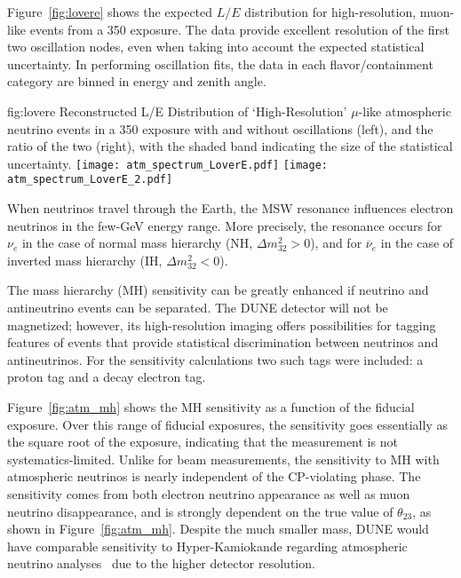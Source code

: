 Figure~\ref{fig:lovere} shows the expected $L/E$ distribution for high-resolution, muon-like 
events from a \SI{350}{\ktyr} exposure. The data provide excellent resolution of the 
first two oscillation nodes, even when taking into account the expected statistical uncertainty.
In performing oscillation fits, the data in each flavor/containment category are 
binned in energy and zenith angle.

\begin{dunefigure}
{fig:lovere}
{Reconstructed L/E Distribution of `High-Resolution'
$\mu$-like atmospheric neutrino events in a \SI{350}{\ktyr} exposure with and
without oscillations (left), and the ratio of the two (right), with the
shaded band indicating the size of the statistical uncertainty.}
\texttt{[image: atm\_spectrum\_LoverE.pdf]}
\texttt{[image: atm\_spectrum\_LoverE\_2.pdf]}
\end{dunefigure}

When neutrinos travel through the Earth, the MSW resonance influences 
electron neutrinos in the few-GeV energy range. More precisely, the resonance 
occurs for $\nu_e$ in the case of normal mass hierarchy (NH, $\Delta m^2_{32} > 0$), and for 
$\overline{\nu}_e$ in the case of inverted mass hierarchy (IH, $\Delta m^2_{32} < 0$).

The mass hierarchy (MH) sensitivity can be greatly enhanced if neutrino and antineutrino events can be 
separated. The DUNE detector will not be magnetized; however, its high-resolution 
imaging offers possibilities for tagging features of events that provide statistical 
discrimination between neutrinos and antineutrinos. For the sensitivity calculations 
two such tags were included: a proton tag and a decay electron tag. 

Figure~\ref{fig:atm_mh} shows the MH sensitivity as a function of the fiducial exposure. 
Over this range of fiducial exposures, the sensitivity goes essentially as the square 
root of the exposure, indicating that the measurement is not systematics-limited. 
Unlike for beam measurements, the sensitivity to MH with atmospheric neutrinos is 
nearly independent of the CP-violating phase.  The sensitivity comes from both 
electron neutrino appearance as well as muon neutrino disappearance, and is strongly 
dependent on the true value of $\theta_{23}$, as shown in Figure~\ref{fig:atm_mh}.  Despite the
much smaller mass, DUNE would have comparable sensitivity to Hyper-Kamiokande regarding atmospheric 
neutrino analyses~\cite{Kearns:2013lea} due to the higher detector resolution.

